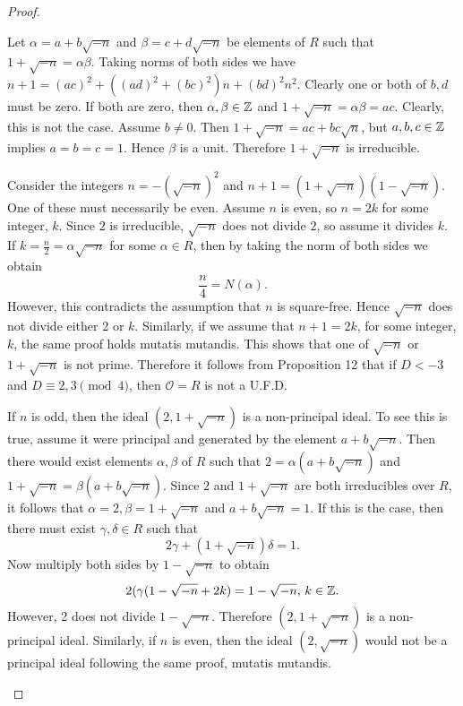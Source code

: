 \documentclass[10pt]{amsart}
\begin{document}
\begin{thm}
\begin{proof}
\begin{alphaenum}
      Let $\alpha = a + b\sqrt{-n}$ and $\beta = c + d\sqrt{-n}$ be elements of $R$ such that $1 + \sqrt{-n} = \alpha\beta$.
      Taking norms of both sides we have $n+1 = (ac)^2 + ((ad)^2 + (bc)^2)n + (bd)^2n^2$.
      Clearly one or both of $b,d$ must be zero.
      If both are zero, then $\alpha,\beta \in \mathbb{Z}$ and $ 1 + \sqrt{-n} = \alpha\beta = ac$.
      Clearly, this is not the case.
      Assume $b \not = 0$.  
      Then $1 + \sqrt{-n} = ac + bc\sqrt{n}$, but $a,b,c \in \mathbb{Z}$ implies $a = b = c= 1$.
      Hence $\beta$ is a unit.
      Therefore $1 + \sqrt{-n}$ is irreducible.
    \item
      Consider the integers $n = -(\sqrt{-n})^2$ and $n+1 = (1 + \sqrt{-n})(1 - \sqrt{-n})$.
      One of these must necessarily be even.
      Assume $n$ is even, so $n = 2k$ for some integer, $k$.  
      Since $2$ is irreducible, $\sqrt{-n}$ does not divide $2$, so assume it divides $k$.
      If $k = \frac{n}{2} = \alpha\sqrt{-n}$ for some $\alpha \in R$, then by taking the norm of both sides we obtain $$\frac{n}{4} = N(\alpha).$$
      However, this contradicts the assumption that $n$ is square-free.
      Hence $\sqrt{-n}$ does not divide either 2 or $k$.
      Similarly, if we assume that $n+1 = 2k$, for some integer, $k$, the same proof holds mutatis mutandis.
      This shows that one of $\sqrt{-n}$ or $1 + \sqrt{-n}$ is not prime.
      Therefore it follows from Proposition 12 that if $D < -3$ and $D \equiv 2,3 \pmod{4}$, then  $\mathcal{O} = R$ is not a U.F.D.
    \item
      If $n$ is odd, then the ideal $(2, 1 + \sqrt{-n})$ is a non-principal ideal.
      To see this is true, assume it were principal and generated by the element $a + b\sqrt{-n}$.
      Then there would exist elements $\alpha, \beta$ of $R$ such that $2 = \alpha(a + b\sqrt{-n})$ and $1 + \sqrt{-n} = \beta(a + b\sqrt{-n})$.
      Since $2$ and $1 + \sqrt{-n}$ are both irreducibles over $R$, it follows that $\alpha = 2, \beta = 1 + \sqrt{-n}$ and $a + b\sqrt{-n}=1$.
      If this is the case, then there must exist $\gamma,\delta \in R$ such that $$2\gamma + (1 + \sqrt{-n})\delta = 1.$$
      Now multiply both sides by $1 - \sqrt{-n}$ to obtain $$2(\gamma(1-\sqrt{-n} + 2k) = 1 - \sqrt{-n},\, k\in \mathbb{Z}.$$
      However, 2 does not divide $1 - \sqrt{-n}$.
      Therefore $(2, 1+\sqrt{-n})$ is a non-principal ideal.
      Similarly, if $n$ is even, then the ideal $(2, \sqrt{-n})$ would not be a principal ideal following the same proof, mutatis mutandis.
    \end{alphaenum}
  \end{proof}
\end{thm}
\end{document}
